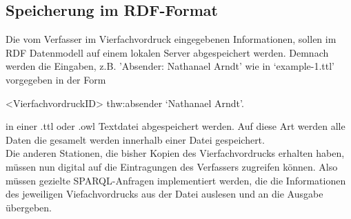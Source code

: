 \subsection{Speicherung im RDF-Format}
Die vom Verfasser im Vierfachvordruck eingegebenen Informationen, sollen im RDF Datenmodell auf einem lokalen Server abgespeichert werden. Demnach werden die Eingaben, z.B. 'Absender: Nathanael Arndt' wie in `example-1.ttl' vorgegeben in der Form 
\begin{center}<VierfachvordruckID> thw:absender `Nathanael Arndt'. \end{center}
in einer .ttl oder .owl Textdatei abgespeichert werden. Auf diese Art werden alle Daten die gesamelt werden innerhalb einer Datei gespeichert. \\
Die anderen Stationen, die bisher Kopien des Vierfachvordrucks erhalten haben, müssen nun digital auf die Eintragungen des Verfassers zugreifen können. Also müssen gezielte SPARQL-Anfragen implementiert werden, die die Informationen des jeweiligen Viefachvordrucks aus der Datei auslesen und an die Ausgabe übergeben.